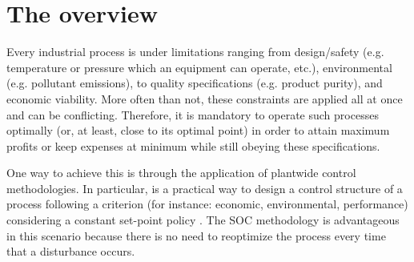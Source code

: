 \documentclass[../msc-thesis.tex]{subfiles}
\begin{document}
\chapter{The \soc overview}

Every  industrial process is under limitations ranging from design/safety (e.g. 
temperature or pressure which an equipment can operate, etc.), environmental 
(e.g. pollutant emissions), to quality specifications (e.g. product purity), 
and economic viability. More often than not, these constraints are applied all 
at once and can be conflicting. Therefore, it is mandatory to operate such 
processes optimally (or, at least, close to its optimal point) in order to 
attain maximum profits or keep expenses at minimum while still obeying these 
specifications.

One way to achieve this is through the application of plantwide control 
methodologies. In particular, \soc \cite{Morari1980,Skogestad2000,Alstad2009} is a 
practical way to design a control structure of a process following a criterion 
(for instance: economic, environmental, performance) considering a constant 
set-point policy \cite{Alves2018}. The SOC methodology is advantageous in 
this scenario because there is no need to reoptimize the process every time 
that a disturbance occurs.
\end{document}

